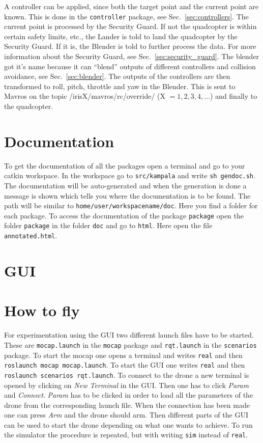 \documentclass[titlepage,11pt,a4paper]{article}
\begin{document}
A controller can be applied, since both the target point and the
current point are known. This is done in the \texttt{controller}
package, see Sec.~\ref{sec:controllers}. The current point is processed by the Security Guard. If not
the quadcopter is within certain safety limits, etc., the Lander
is told to land the quadcopter by the Security Guard. If it is, the
Blender is told to further process the data. For more information
about the Security Guard, see Sec.~\ref{sec:security_guard}. The
blender got it's name because it can ``blend'' outputs of different
controllers and collision avoidance, see Sec.~\ref{sec:blender}. The
outputs of the controllers are then transformed to roll, pitch,
throttle and yaw in the Blender. This is sent to Mavros on the
topic /irisX/mavros/rc/override/ (X $= 1, 2, 3, 4, \dots$) and finally
to the quadcopter.

\section{Documentation}
\label{sec:documentation}

To get the documentation of all the packages open a terminal and go to your catkin workspace. In the workspace go to \texttt{src/kampala} and write \texttt{sh gen\textunderscore doc.sh}. The documentation will be auto-generated and when the generation is done a message is shown which tells you where the documentation is to be found. The path will be similar to \texttt{home/user/workspace\textunderscore name/doc}. Here you find a folder for each package. To access the documentation of the package \texttt{package} open the folder \texttt{package} in the folder \texttt{doc} and go to \texttt{html}. Here open the file \texttt{annotated.html}.



\section{GUI}
\label{sec:gui}


\section{How to fly}
For experimentation using the GUI two different launch files have to
be started. These are \texttt{mocap.launch} in the \texttt{mocap}
package and \texttt{rqt.launch} in the \texttt{scenarios} package. To
start the mocap one opens a terminal and writes \texttt{real} and then
\texttt{roslaunch mocap mocap.launch}. To start the GUI one writes
\texttt{real} and then \texttt{roslaunch scenarios rqt.launch}. To
connect to the drone a new terminal is opened by clicking on
\textit{New Terminal} in the GUI. Then one has to click \textit{Param}
and \textit{Connect}. \textit{Param} has to be clicked in order to
load all the parameters of the drone from the corresponding launch
file. When the connection has been made one can press \textit{Arm} and
the drone should arm. Then different parts of the GUI can be used to
start the drone depending on what one wants to achieve. To run the
simulator the procedure is repeated, but with writing \texttt{sim}
instead of \texttt{real}.
\end{document}
